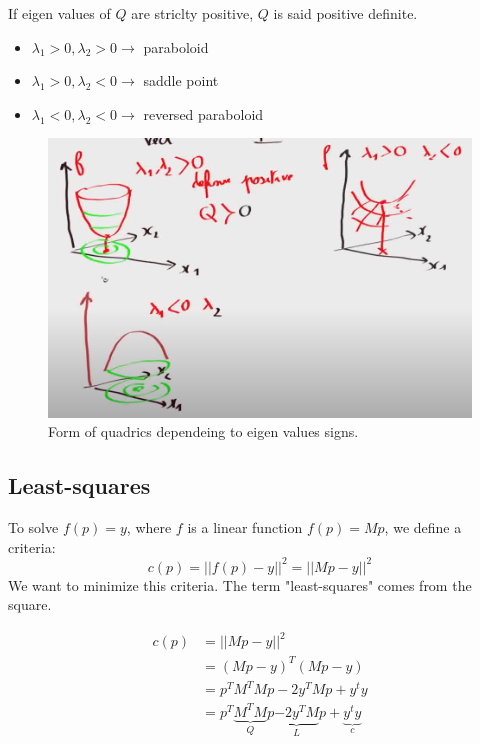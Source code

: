 If eigen values of $Q$ are striclty positive, $Q$ is said positive definite.

\begin{itemize}
    \item $\lambda_1 > 0, \lambda_2 > 0 \longrightarrow$  paraboloid
    \item $\lambda_1 > 0, \lambda_2 < 0 \longrightarrow$  saddle point
    \item $\lambda_1 < 0, \lambda_2 < 0 \longrightarrow$  reversed paraboloid
\end{itemize}


\begin{figure}[H]
    \centering
    \includegraphics[scale=0.3]{content/Quadratic_function_eigen_values.png}
    \caption{Form of quadrics dependeing to eigen values signs.}
    \label{fig:resnet}
\end{figure}

\subsection{Least-squares}

To solve $f(p) = y$, where $f$ is a linear function $f(p) = M p$, we define a criteria:
\begin{equation}
    c(p) = ||f(p)-y||^2 = ||M p-y||^2
\end{equation}
We want to minimize this criteria. The term "least-squares" comes from the square.

\begin{equation}
\begin{split}
    c(p) &= ||M p-y||^2  \\
    &= (Mp-y)^T(Mp-y) \\
    &=p^T M^T M p - 2 y^T M p + y^t y \\
    &=p^T \underbrace{M^T M}_{Q} p \underbrace{- 2 y^T M}_{L}p + \underbrace{y^t y}_{c} \\
\end{split}
\end{equation}

